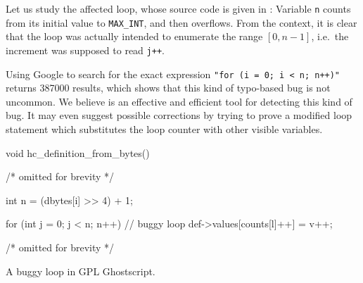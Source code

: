 Let us study the affected loop, whose source code is given in : Variable \verb!n! counts from its initial value to \verb!MAX_INT!, and then overflows. From the context, it is clear that the loop was actually intended to enumerate the range $[0,n-1]$, i.e.\ the increment was supposed to read \verb!j++!.

Using Google to search for the exact expression \verb!"for (i = 0; i < n; n++)"! returns \num{387000} results, which shows that this kind of typo-based bug is not uncommon. We believe \sloopy{} is an effective and efficient tool for detecting this kind of bug. It may even suggest possible corrections by trying to prove a modified loop statement which substitutes the loop counter with other visible variables.

\begin{listing}
    \begin{ccode}
void hc_definition_from_bytes() {

    /* omitted for brevity */

    int n = (dbytes[i] >> 4) + 1;

    for (int j = 0; j < n; n++) {   // buggy loop
        def->values[counts[l]++] = v++;
    }

    /* omitted for brevity */
}
    \end{ccode}
    \caption{A buggy loop in GPL Ghostscript.}
    \label{lst:ghostscript}
\end{listing}
